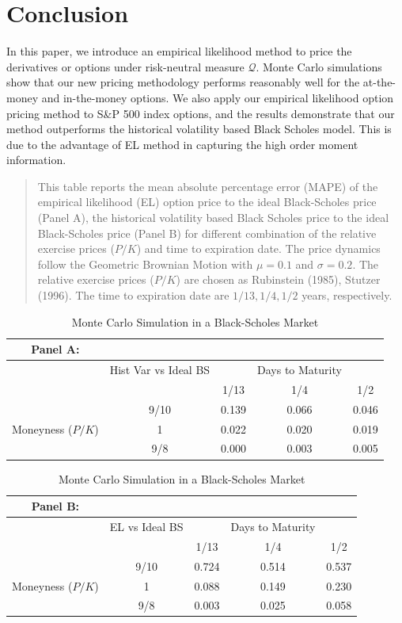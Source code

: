 \section{Conclusion}
In this paper, we introduce an empirical likelihood method to price the derivatives or options under risk-neutral measure $\mathcal{Q}$. Monte Carlo simulations show that our new pricing methodology performs reasonably well for the at-the-money and in-the-money options. We also apply our empirical likelihood option pricing method to S\&P 500 index options, and the results demonstrate that our method outperforms the historical volatility based Black Scholes model. This is due to the advantage of EL method in capturing the high order moment information.

\begin{table}[t]
\centering \caption{ Monte Carlo Simulation in a Black-Scholes Market}

\begin{quote} %

This table reports the mean absolute percentage error (MAPE) of the empirical likelihood (EL) option price to the ideal Black-Scholes price (Panel A), the historical volatility based Black Scholes price to the ideal Black-Scholes price (Panel B) for different combination of the relative exercise prices ($P/K$) and time to expiration date. The price dynamics follow the Geometric Brownian Motion with $\mu=0.1$ and $\sigma=0.2$. The relative exercise prices ($P/K$) are chosen as Rubinstein (1985), Stutzer (1996). The time to expiration date are $1/13, 1/4, 1/2$ years, respectively.  
\end{quote}

\begin{tabular}{ccccc}
\noindent Panel A: &&&& \\

\hline\hline 
& Hist Var vs Ideal BS & & Days to Maturity &\tabularnewline
& & 1/13 & 1/4 & 1/2\tabularnewline
\hline 

& 9/10 & 0.139 & 0.066 & 0.046\tabularnewline

Moneyness ($P/K$) & 1 & 0.022 & 0.020 & 0.019\tabularnewline

& 9/8 & 0.000 & 0.003 & 0.005\tabularnewline \hline
\end{tabular}\newline\newline\newline


\begin{tabular}{ccccc}
\noindent Panel B: &&&& \\
\hline\hline 
& EL vs Ideal BS & & Days to Maturity &\tabularnewline
& & 1/13 & 1/4 & 1/2\tabularnewline
\hline 

& 9/10 & 0.724 & 0.514 & 0.537\tabularnewline

Moneyness ($P/K$) & 1 & 0.088 & 0.149 & 0.230\tabularnewline

& 9/8 & 0.003 & 0.025 & 0.058\tabularnewline \hline
\end{tabular}\newline

\end{table}

